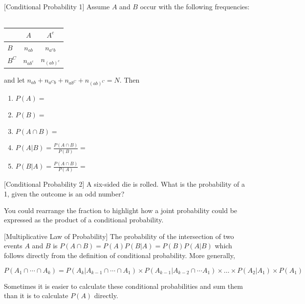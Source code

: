 \documentclass[]{book}
\providecommand{\tightlist}{%
  \setlength{\itemsep}{0pt}\setlength{\parskip}{0pt}}
\theoremstyle{definition}
\theoremstyle{definition}
\theoremstyle{definition}
\theoremstyle{remark}
\begin{document}
[Conditional Probability 1]
\protect\hypertarget{exm:condprobexm1}{}{\label{exm:condprobexm1} {} }
Assume \(A\) and \(B\) occur with the following frequencies: \(\quad\)

\begin{longtable}[]{@{}lcc@{}}
\toprule
& \(A\) & \(A^c\)\tabularnewline
\midrule
\endhead
\(B\) & \(n_{ab}\) & \(n_{a^cb}\)\tabularnewline
\(B^C\) & \(n_{ab^c}\) & \(n_{(ab)^c}\)\tabularnewline
\bottomrule
\end{longtable}

and let \(n_{ab}+n_{a^Cb}+n_{ab^C}+n_{(ab)^C}=N\). Then

\begin{enumerate}
\def\labelenumi{\arabic{enumi}.}
\tightlist
\item
  \(P(A)=\)
\item
  \(P(B)=\)
\item
  \(P(A\cap B)=\)
\item
  \(P(A|B)= \frac{P(A\cap B)}{P(B)}=\)
\item
  \(P(B|A)= \frac{P(A\cap B)}{P(A)}=\)
\end{enumerate}

[Conditional Probability 2]
\protect\hypertarget{exm:condprobexm2}{}{\label{exm:condprobexm2} {} }
A six-sided die is rolled. What is the probability of a 1, given the outcome is an odd number?

You could rearrange the fraction to highlight how a joint probability could be expressed as the product of a conditional probability.

[Multiplicative Law of Probability]
\protect\hypertarget{def:unnamed-chunk-68}{}{\label{def:unnamed-chunk-68} {} }
The probability of the intersection of two events \(A\) and \(B\) is \(P(A\cap B)=P(A)P(B|A)=P(B)P(A|B)\) which follows directly from the definition of conditional probability. More generally,

\[P(A_1\cap \cdots\cap A_k) = P(A_k| A_{k-1}\cap \cdots \cap A_1)\times P(A_{k-1}|A_{k-2}\cap \cdots A_1) \times \ldots \times P(A_2|A_1)\times P(A_1)\]

Sometimes it is easier to calculate these conditional probabilities and sum them than it is to calculate \(P(A)\) directly.
\end{document}
